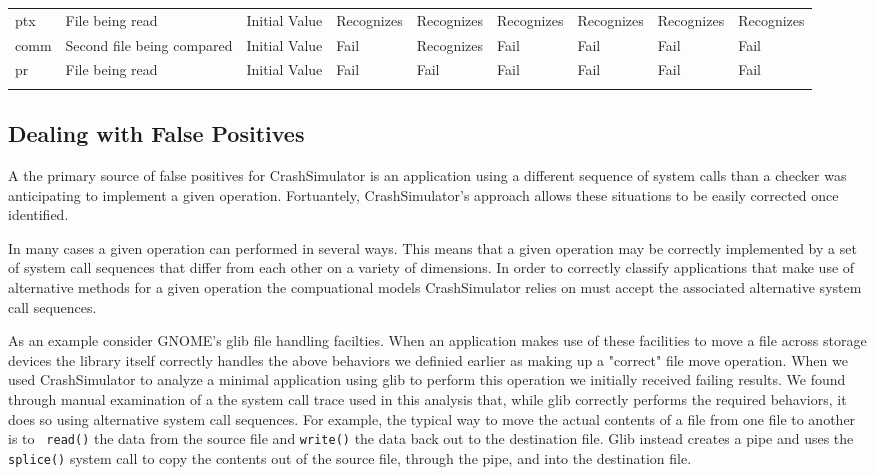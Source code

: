 \begin{table*}[t]
\begin{tabular}{l  l  l  | l}
                  ptx         & File being read            & Initial Value  & Recognizes     & Recognizes  & Recognizes & Recognizes  & Recognizes & Recognizes\\
                  comm        & Second file being compared & Initial Value  & Fail           & Recognizes  & Fail       & Fail        & Fail       & Fail\\
                  pr          & File being read            & Initial Value  & Fail           & Fail        & Fail       & Fail        & Fail       & Fail\\
                \bottomrule{}
                \end{tabular}
            \end{table*}

    \subsection{Dealing with False Positives}

    A the primary source of false positives for CrashSimulator is an application using a different sequence of system
    calls than a checker was anticipating to implement a given operation.  Fortuantely, CrashSimulator's approach allows
    these situations to be easily corrected once identified.

    In many cases a given operation can performed in several ways.  This means that a given operation may be correctly
    implemented by a set of system call sequences that differ from each other on a variety of dimensions.  In order to
    correctly classify applications that make use of alternative methods for a given operation the compuational models
    CrashSimulator relies on must accept the associated alternative system call sequences.

    As an example consider GNOME's glib file handling facilties.  When an application makes use of these facilities to move
    a file across storage devices the library itself correctly handles the above behaviors we definied earlier as making up
    a "correct" file move operation.  When we used CrashSimulator to analyze a minimal application using glib to perform
    this operation we initially received failing results.  We found through manual examination of a the system call trace
    used in this analysis that, while glib correctly performs the required behaviors, it does so using alternative system
    call sequences.  For example, the typical way to move the actual contents of a file from one file to another is to {\tt
      read()} the data from the source file and {\tt write()} the data back out to the destination file.  Glib instead
    creates a pipe and uses the {\tt splice()} system call to copy the contents out of the source file, through the pipe,
    and into the destination file.

